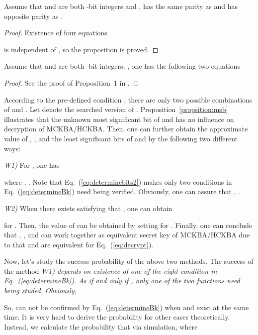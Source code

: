 \documentclass{ws-ijbc}
\begin{document}
\begin{proposition}
Assume that  and  are both -bit integers and ,
 has the same parity as  and  has opposite parity as .
\label{propsition:lsb}
\end{proposition}
\begin{proof}
Existence of four equations

is independent of , so the proposition is proved.
\end{proof}

\begin{proposition}
Assume that  and  are both -bit integers, , one has the following two equations

\label{propsition:msb}
\end{proposition}
\begin{proof}
See the proof of Proposition~1 in \cite{LCQ:MCKBA:IJBC11}.
\end{proof}

According to the pre-defined condition , there are only two possible combinations of  and .  Let  denote the searched version of . Proposition~\ref{propsition:msb} illustrates that the unknown most significant bit of  and  has no influence on decryption of MCKBA/HCKBA. Then, one can further obtain the approximate value of , , and the  least significant bits of
 and  by the following two different ways:
\begin{itemlist}
\item  \textit{W1)} For , one has

where , . Note that
Eq.~(\ref{eq:determinebits2}) makes only two conditions in Eq.~(\ref{eq:determineBk}) need being
verified. Obviously, one can assure that , .


\item \textit{W2)} When there exists  satisfying that , one can obtain

for . Then, the value of  can be obtained by setting  for
. Finally, one can conclude that , , and
 can work together as equivalent secret key of MCKBA/HCKBA due to that 
and  are equivalent for Eq.~(\ref{eq:decrypt}).
\end{itemlist}

Now, let's study the success probability of the above two methods. The success of the method \textit{W1) depends on existence of one of the eight
condition in Eq.~(\ref{eq:determineBk}). As  if and only if , only one of the two functions
need being studed. Obviously, }

So,  can not be confirmed by  Eq.~(\ref{eq:determineBk}) when
  and  exist at the same time. It is very hard to derive the probability for other cases theoretically.
Instead, we calculate the probability that  via simulation, where
\end{document}
